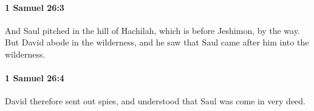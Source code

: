 		\paragraph{1 Samuel 26:3} %
			\label{1SAMUEL-26-3}

			And Saul pitched in the hill of Hachilah, which is before Jeshimon, by the way. But David abode in the wilderness, and he saw that Saul came after him into the wilderness.


		\paragraph{1 Samuel 26:4} %
			\label{1SAMUEL-26-4}

			David therefore sent out spies, and understood that Saul was come in very deed.


